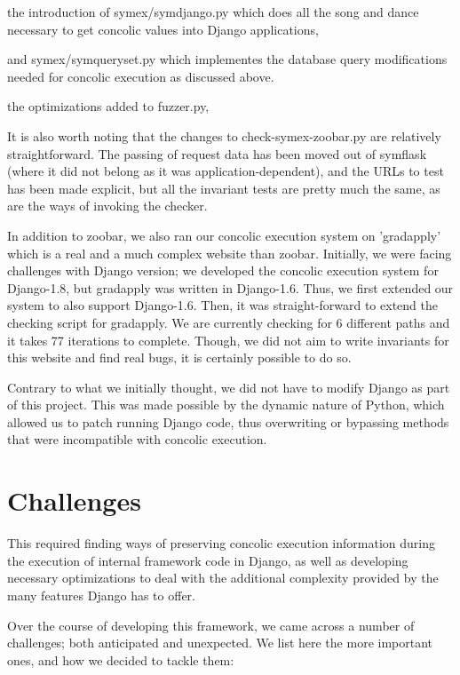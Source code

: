 \documentclass{scrartcl}
\begin{document}
the introduction of symex/symdjango.py which does all the song and 
  dance necessary to get concolic values into Django applications,


and symex/symqueryset.py which implementes the database query
  modifications needed for concolic execution as discussed above.


the optimizations added to fuzzer.py,

It is also
worth noting that the changes to check-symex-zoobar.py are relatively
straightforward. The passing of request data has been moved out of symflask
(where it did not belong as it was application-dependent), and the URLs to test
has been made explicit, but all the invariant tests are pretty much the same,
as are the ways of invoking the checker.

In addition to zoobar, we also ran our concolic execution system on
'gradapply' which is a real and a much complex website than zoobar.
Initially, we were facing challenges with Django version; we developed
the concolic execution system for Django-1.8, but gradapply was written
in Django-1.6. Thus, we first extended our system to also support
Django-1.6. Then, it was straight-forward to extend the checking script
for gradapply. We are currently checking for 6 different paths and it takes
77 iterations to complete. Though, we did not aim to write invariants for
this website and find real bugs, it is certainly possible to do so.

Contrary to what we initially thought, we did not have to modify
Django as part of this project. This was made possible by the dynamic
nature of Python, which allowed us to patch running Django code, thus
overwriting or bypassing methods that were incompatible with concolic
execution.


\section{Challenges}

This required finding ways of preserving concolic execution information during
the execution of internal framework code in Django, as well as developing
necessary optimizations to deal with the additional complexity provided by the
many features Django has to offer.

Over the course of developing this framework, we came across a number of
challenges; both anticipated and unexpected. We list here the more important
ones, and how we decided to tackle them:
\end{document}
